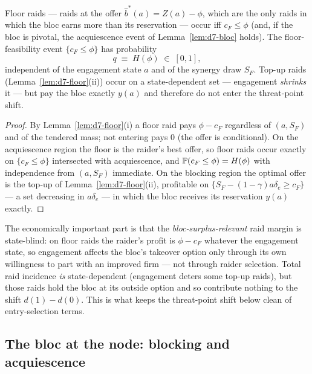 \begin{lemma}
\label{lem:d7-entry}
Floor raids --- raids at the offer $\hat b^{\ast}(a)=Z(a)-\phi$, which are the only raids in which the bloc earns more than its reservation --- occur iff $c_{F}\le\phi$ (and, if the bloc is pivotal, the acquiescence event of Lemma~\ref{lem:d7-bloc} holds). The floor-feasibility event $\{c_{F}\le\phi\}$ has probability
\[
q\;\equiv\;H(\phi)\;\in\;[0,1],
\]
independent of the engagement state $a$ and of the synergy draw $S_{F}$. Top-up raids (Lemma~\ref{lem:d7-floor}(ii)) occur on a state-dependent set --- engagement \emph{shrinks} it --- but pay the bloc exactly $y(a)$ and therefore do not enter the threat-point shift.
\end{lemma}

\begin{proof}
By Lemma~\ref{lem:d7-floor}(i) a floor raid pays $\phi-c_{F}$ regardless of $(a,S_{F})$ and of the tendered mass; not entering pays $0$ (the offer is conditional). On the acquiescence region the floor is the raider's best offer, so floor raids occur exactly on $\{c_{F}\le\phi\}$ intersected with acquiescence, and $\mathbb{P}(c_{F}\le\phi)=H(\phi)$ with independence from $(a,S_{F})$ immediate. On the blocking region the optimal offer is the top-up of Lemma~\ref{lem:d7-floor}(ii), profitable on $\{S_{F}-(1-\gamma)a\delta_{e}\ge c_{F}\}$ --- a set decreasing in $a\delta_{e}$ --- in which the bloc receives its reservation $y(a)$ exactly.
\end{proof}

The economically important part is that the \emph{bloc-surplus-relevant} raid margin is state-blind: on floor raids the raider's profit is $\phi-c_{F}$ whatever the engagement state, so engagement affects the bloc's takeover option only through its own willingness to part with an improved firm --- not through raider selection. Total raid incidence \emph{is} state-dependent (engagement deters some top-up raids), but those raids hold the bloc at its outside option and so contribute nothing to the shift $d(1)-d(0)$. This is what keeps the threat-point shift below clean of entry-selection terms.

\subsection{The bloc at the node: blocking and acquiescence}

